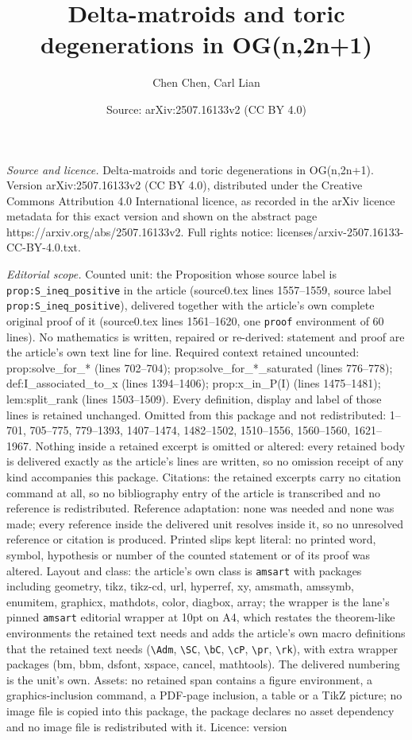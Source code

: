 \documentclass[10pt,a4paper]{amsart}
\title[Delta-matroids and toric degenerations in OG(n,2n+1)]{Delta-matroids and toric degenerations in OG(n,2n+1)}
\author{Chen Chen, Carl Lian}
\date{Source: arXiv:2507.16133v2 (CC BY 4.0)}
\begin{document}
\maketitle

\noindent\emph{Source and licence.} Delta-matroids and toric degenerations in OG(n,2n+1). Version arXiv:2507.16133v2 (CC BY 4.0), distributed under the Creative Commons Attribution 4.0 International licence, as recorded in the arXiv licence metadata for this exact version and shown on the abstract page https://arxiv.org/abs/2507.16133v2. Full rights notice: licenses/arxiv-2507.16133-CC-BY-4.0.txt.\par\smallskip

\noindent\textit{Editorial scope.} Counted unit: the Proposition whose source label is \texttt{prop:S\_ineq\_positive} in the article (source0.tex lines 1557--1559, source label \texttt{prop:S\_ineq\_positive}), delivered together with the article's own complete original proof of it (source0.tex lines 1561--1620, one \texttt{proof} environment of 60 lines). No mathematics is written, repaired or re-derived: statement and proof are the article's own text line for line. Required context retained uncounted: prop:solve\_for\_* (lines 702--704); prop:solve\_for\_*\_saturated (lines 776--778); def:I\_associated\_to\_x (lines 1394--1406); prop:x\_in\_P(I) (lines 1475--1481); lem:split\_rank (lines 1503--1509). Every definition, display and label of those lines is retained unchanged. Omitted from this package and not redistributed: 1--701, 705--775, 779--1393, 1407--1474, 1482--1502, 1510--1556, 1560--1560, 1621--1967. Nothing inside a retained excerpt is omitted or altered: every retained body is delivered exactly as the article's lines are written, so no omission receipt of any kind accompanies this package. Citations: the retained excerpts carry no citation command at all, so no bibliography entry of the article is transcribed and no reference is redistributed. Reference adaptation: none was needed and none was made; every reference inside the delivered unit resolves inside it, so no unresolved reference or citation is produced. Printed slips kept literal: no printed word, symbol, hypothesis or number of the counted statement or of its proof was altered. Layout and class: the article's own class is \texttt{amsart} with packages including geometry, tikz, tikz-cd, url, hyperref, xy, amsmath, amssymb, enumitem, graphicx, mathdots, color, diagbox, array; the wrapper is the lane's pinned \texttt{amsart} editorial wrapper at 10pt on A4, which restates the theorem-like environments the retained text needs and adds the article's own macro definitions that the retained text needs (\texttt{\textbackslash Adm}, \texttt{\textbackslash SC}, \texttt{\textbackslash bC}, \texttt{\textbackslash cP}, \texttt{\textbackslash pr}, \texttt{\textbackslash rk}), with extra wrapper packages (bm, bbm, dsfont, xspace, cancel, mathtools). The delivered numbering is the unit's own. Assets: no retained span contains a figure environment, a graphics-inclusion command, a PDF-page inclusion, a table or a TikZ picture; no image file is copied into this package, the package declares no asset dependency and no image file is redistributed with it. Licence: version 
\end{document}
